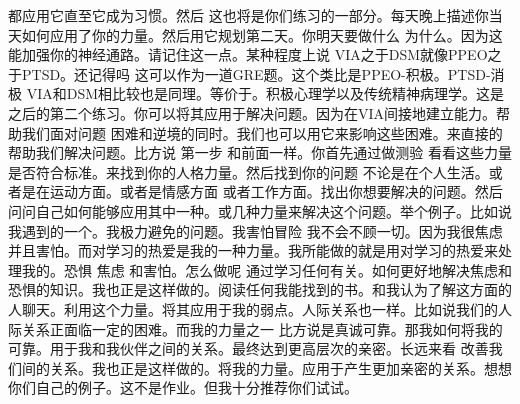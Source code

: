 都应用它直至它成为习惯。然后 这也将是你们练习的一部分。每天晚上描述你当天如何应用了你的力量。然后用它规划第二天。你明天要做什么 为什么。因为这能加强你的神经通路。请记住这一点。某种程度上说 VIA之于DSM就像PPEO之于PTSD。还记得吗 这可以作为一道GRE题。这个类比是PPEO-积极。PTSD-消极 VIA和DSM相比较也是同理。等价于。积极心理学以及传统精神病理学。这是之后的第二个练习。你可以将其应用于解决问题。因为在VIA间接地建立能力。帮助我们面对问题 困难和逆境的同时。我们也可以用它来影响这些困难。来直接的帮助我们解决问题。比方说 第一步 和前面一样。你首先通过做测验 看看这些力量是否符合标准。来找到你的人格力量。然后找到你的问题 不论是在个人生活。或者是在运动方面。或者是情感方面 或者工作方面。找出你想要解决的问题。然后问问自己如何能够应用其中一种。或几种力量来解决这个问题。举个例子。比如说我遇到的一个。我极力避免的问题。我害怕冒险 我不会不顾一切。因为我很焦虑 并且害怕。而对学习的热爱是我的一种力量。我所能做的就是用对学习的热爱来处理我的。恐惧 焦虑 和害怕。怎么做呢 通过学习任何有关。如何更好地解决焦虑和恐惧的知识。我也正是这样做的。阅读任何我能找到的书。和我认为了解这方面的人聊天。利用这个力量。将其应用于我的弱点。人际关系也一样。比如说我们的人际关系正面临一定的困难。而我的力量之一 比方说是真诚可靠。那我如何将我的可靠。用于我和我伙伴之间的关系。最终达到更高层次的亲密。长远来看 改善我们间的关系。我也正是这样做的。将我的力量。应用于产生更加亲密的关系。想想你们自己的例子。这不是作业。但我十分推荐你们试试。 
%
